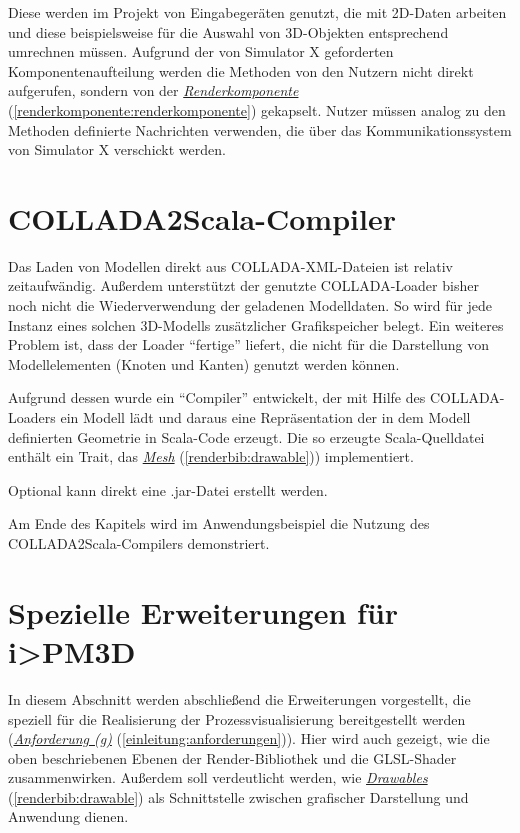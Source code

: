 \documentclass[a4paper,10pt]{sphinxmanual}
\begin{document}
Diese werden im Projekt von Eingabegeräten genutzt, die mit 2D-Daten arbeiten und diese beispielsweise für die Auswahl von 3D-Objekten entsprechend umrechnen müssen.
Aufgrund der von Simulator X geforderten Komponentenaufteilung werden die Methoden von den Nutzern nicht direkt aufgerufen, sondern von der {\hyperref[renderkomponente:renderkomponente]{\emph{Renderkomponente}}} (\autoref*{renderkomponente:renderkomponente}) gekapselt.
Nutzer müssen analog zu den Methoden definierte Nachrichten verwenden, die über das Kommunikationssystem von Simulator X verschickt werden.


\section{COLLADA2Scala-Compiler}
\label{renderbib:collada2scala-compiler}
Das Laden von Modellen direkt aus COLLADA-XML-Dateien ist relativ zeitaufwändig.
Außerdem unterstützt der genutzte COLLADA-Loader \cite{uli} bisher noch nicht die Wiederverwendung der geladenen Modelldaten.
So wird für jede Instanz eines solchen 3D-Modells zusätzlicher Grafikspeicher belegt.
Ein weiteres Problem ist, dass der Loader "`fertige"'  liefert, die nicht für die Darstellung von Modellelementen (Knoten und Kanten) genutzt werden können.

Aufgrund dessen wurde ein "`Compiler"' entwickelt, der mit Hilfe des COLLADA-Loaders ein Modell lädt und daraus eine Repräsentation der in dem Modell definierten Geometrie in Scala-Code erzeugt.
Die so erzeugte Scala-Quelldatei enthält ein Trait, das {\hyperref[renderbib:drawable]{\emph{Mesh}}} (\autoref*{renderbib:drawable})) implementiert.

Optional kann direkt eine .jar-Datei erstellt werden.

Am Ende des Kapitels wird im Anwendungsbeispiel die Nutzung des COLLADA2Scala-Compilers demonstriert.


\section{Spezielle Erweiterungen für i\textgreater{}PM3D}
\label{renderbib:spezielle-erweiterungen-fur-i-pm3d}
In diesem Abschnitt werden abschließend die Erweiterungen vorgestellt, die speziell für die Realisierung der Prozessvisualisierung bereitgestellt werden ({\hyperref[einleitung:anforderungen]{\emph{Anforderung (g)}}} (\autoref*{einleitung:anforderungen})).
Hier wird auch gezeigt, wie die oben beschriebenen Ebenen der Render-Bibliothek und die GLSL-Shader zusammenwirken.
Außerdem soll verdeutlicht werden, wie {\hyperref[renderbib:drawable]{\emph{Drawables}}} (\autoref*{renderbib:drawable}) als Schnittstelle zwischen grafischer Darstellung und Anwendung dienen.
\end{document}
